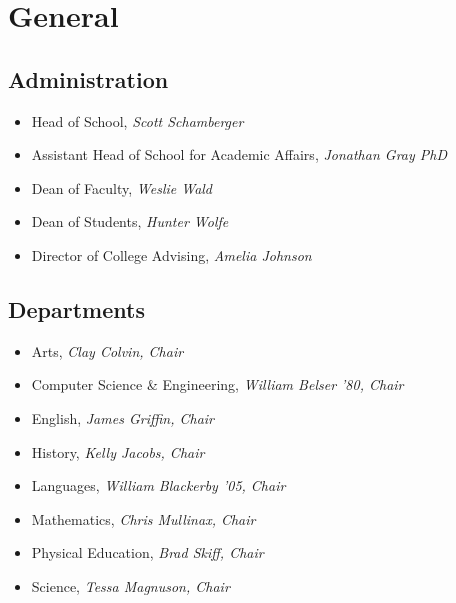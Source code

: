 \chapter{General}
\section{Administration}

\begin{itemize}\itemsep=0mm
  \item[] Head of School, \emph{Scott Schamberger}
  \item[] Assistant Head of School for Academic Affairs, \emph{Jonathan Gray PhD}
  \item[] Dean of Faculty, \emph{Weslie Wald}
  \item[] Dean of Students, \emph{Hunter Wolfe}
  \item[] Director of College Advising, \emph{Amelia Johnson}
\end{itemize}

\section{Departments}

\begin{itemize}\itemsep=0mm
  \item[] Arts, \emph{Clay Colvin, Chair}
  \item[] Computer Science \& Engineering, \emph{William Belser '80, Chair}
  \item[] English, \emph{James Griffin, Chair}
  \item[] History, \emph{Kelly Jacobs, Chair}
  \item[] Languages, \emph{William Blackerby  '05, Chair}
  \item[] Mathematics, \emph{Chris Mullinax, Chair}
  \item[] Physical Education, \emph{Brad Skiff, Chair}
  \item[] Science, \emph{Tessa Magnuson, Chair               }
\end{itemize}

